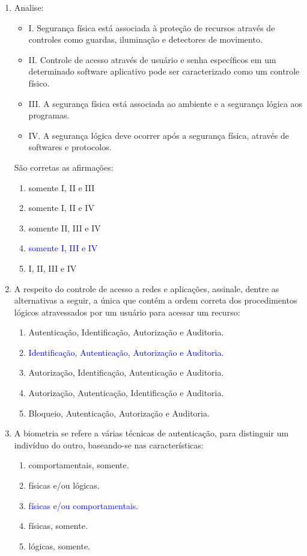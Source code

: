 \documentclass{report}
\begin{document}
\begin{enumerate}
		\item Analise:
		\begin{itemize}
			\item I. Segurança física está associada à proteção de recursos através de controles como guardas, iluminação e detectores de movimento.
			\item II. Controle de acesso através de usuário e senha específicos em um determinado software aplicativo pode ser caracterizado como um controle físico.
			\item III. A segurança física está associada ao ambiente e a segurança lógica aos programas.
			\item IV. A segurança lógica deve ocorrer após a segurança física, através de softwares e protocolos.
		\end{itemize}
		São corretas as afirmações:
		\begin{enumerate}[label=(\alph*)]
			\item somente I, II e III
			\item somente I, II e IV
			\item somente II, III e IV
			\item \textcolor{blue}{somente I, III e IV}
			\item I, II, III e IV
		\end{enumerate}
		
		\item A respeito do controle de acesso a redes e aplicações, assinale, dentre as alternativas a seguir, a única que contém a ordem correta dos procedimentos lógicos atravessados por um usuário para acessar um recurso:
		\begin{enumerate}[label=(\alph*)]
			\item Autenticação, Identificação, Autorização e Auditoria.
			\item \textcolor{blue}{Identificação, Autenticação, Autorização e Auditoria.}
			\item Autorização, Identificação, Autenticação e Auditoria.
			\item Autorização, Autenticação, Identificação e Auditoria.
			\item Bloqueio, Autenticação, Autorização e Auditoria.
		\end{enumerate}
		
		\item A biometria se refere a várias técnicas de autenticação, para distinguir um indivíduo do outro, baseando-se nas características:
		\begin{enumerate}[label=(\alph*)]
			\item comportamentais, somente.
			\item físicas e/ou lógicas.
			\item \textcolor{blue}{físicas e/ou comportamentais.}
			\item físicas, somente.
			\item lógicas, somente.
		\end{enumerate}
		

\end{enumerate}
\end{document}
